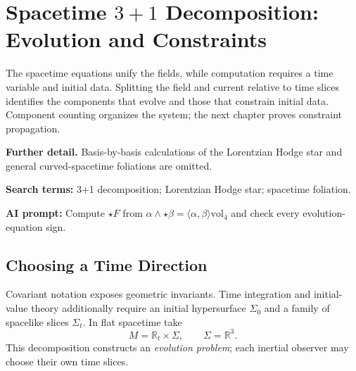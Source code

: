 \documentclass[11pt,openany]{book}
\numberwithin{equation}{chapter}
\theoremstyle{definition}
\theoremstyle{remark}
\newcommand{\RR}{\mathbb R}
\newcommand{\vol}{\mathrm{vol}}
\newcommand{\studyroute}[3]{%
  \par\smallskip\noindent\textbf{Further detail.} #1\par
  \begingroup\raggedright\noindent\textbf{Search terms:} #2.\par\endgroup
  \noindent\textbf{AI prompt:} #3\par
}
\begin{document}
\chapter{Spacetime \texorpdfstring{$3+1$}{3+1} Decomposition: Evolution and Constraints}
\label{ch:31}
\begin{chaptersummary}
The spacetime equations unify the fields, while computation requires a time variable and initial data. Splitting the field and current relative to time slices identifies the components that evolve and those that constrain initial data. Component counting organizes the system; the next chapter proves constraint propagation.
\end{chaptersummary}
\studyroute{Basis-by-basis calculations of the Lorentzian Hodge star and general curved-spacetime foliations are omitted.}{3+1 decomposition; Lorentzian Hodge star; spacetime foliation}{Compute $\star F$ from $\alpha\wedge\star\beta=\langle\alpha,\beta\rangle\vol_4$ and check every evolution-equation sign.}
\section{Choosing a Time Direction}
Covariant notation exposes geometric invariants. Time integration and initial-value theory additionally require an initial hypersurface $\Sigma_0$ and a family of spacelike slices $\Sigma_t$. In flat spacetime take
\begin{equation}
M=\RR_t\times\Sigma,\qquad \Sigma=\RR^3.
\end{equation}
This decomposition constructs an \emph{evolution problem}; each inertial observer may choose their own time slices.
\end{document}
